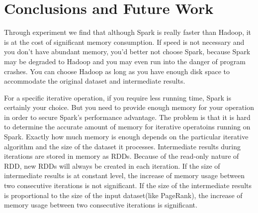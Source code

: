 \documentclass[12pt,conference,letterpaper]{IEEEtran}
\begin{document}
%







\section{Conclusions and Future Work}
\label{sec:concl_fw}

Through experiment we find that although Spark is really faster than Hadoop, it is at the cost of significant memory consumption. If speed is not necessary and you don't have abundant memory, you'd better not choose Spark, because Spark may be degraded to Hadoop and you may even run into the danger of program crashes. You can choose Hadoop as long as you have enough disk space to accommodate the original dataset and intermediate results.

For a specific iterative operation, if you require less running time, Spark is certainly your choice. But you need to provide enough memory for your operation in order to secure Spark's performance advantage. The problem is that it is hard to determine the accurate amount of memory for iterative operatoins running on Spark. Exactly how much memory is enough depends on the particular iterative algorithm and the size of the dataset it processes. Intermediate results during iterations are stored in memory as RDDs. Because of the read-only nature of RDD, new RDDs will always be created in each iteration. If the size of intermediate results is at constant level, the increase of memory usage between two consecutive iterations is not significant. If the size of the intermediate results is proportional to the size of the input dataset(like PageRank), the increase of memory usage between two consecutive iterations is significant.
\end{document}

